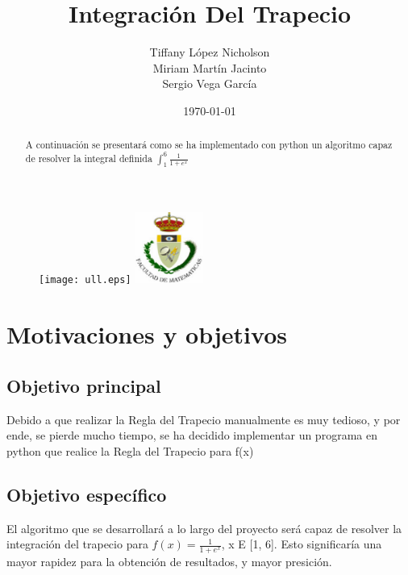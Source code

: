 \documentclass{article}
\begin{document}
  \begin{figure}[t]
    \begin{center}
        \texttt{[image: ull.eps]}
        \hspace{5.5cm}
	\includegraphics[width=0.2\textwidth]{fmatesc.eps}
    \end{center}
  \end{figure}
  \title{Integración Del Trapecio}
  \author{Tiffany López Nicholson \\ Miriam Martín Jacinto \\ Sergio Vega García}
  \date{\today}
  \maketitle

  \begin{abstract}
    \begin{center}
       A continuación se presentará como se ha implementado con python un algoritmo capaz de resolver la integral definida $\int_{1}^{6} \frac{1}{1+e^x}$
    \end{center}
  \end{abstract}
  \pagebreak


  \tableofcontents
  \pagebreak
  
  
  \section{Motivaciones y objetivos}
    \subsection{Objetivo principal}
       Debido a que realizar la Regla del Trapecio manualmente es muy tedioso, y por ende, se pierde mucho tiempo, se ha decidido implementar un programa en python que realice la Regla del Trapecio para f(x)
    \subsection{Objetivo específico} 
       El algoritmo que se desarrollará a lo largo del proyecto será capaz de resolver la integración del trapecio para $ f(x) = \frac{1}{1 + e^{x}}$, x E [1, 6]. Esto significaría una mayor rapidez para la obtención de resultados, y mayor presición.
  \pagebreak
\end{document}
